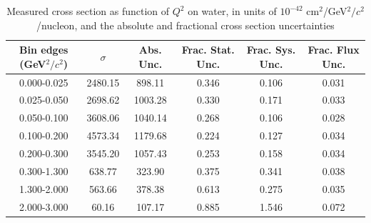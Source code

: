 \documentclass[../main.tex]{subfiles}
\begin{document}
\begin{table}
  \centering
  \renewcommand{\arraystretch}{1.15}
  \caption{Measured cross section as function of $Q^2$ on water, in units of $10^{-42}$ $\text{cm}^2$/GeV${}^2/c{}^2$/nucleon, and the absolute and fractional cross section uncertainties}
    \begin{tabular}{c||c|c||c|c|c}
      Bin edges (GeV${}^2/c{}^2$) &  $\sigma$  &  Abs. Unc.  &  Frac. Stat. Unc.  &  Frac. Sys. Unc.  &  Frac. Flux Unc. \\
      \hline
      \hline
      0.000-0.025 & 2480.15 & 898.11 & 0.346 & 0.106 & 0.031\\
      0.025-0.050 & 2698.62 & 1003.28 & 0.330 & 0.171 & 0.033\\
      0.050-0.100 & 3608.06 & 1040.14 & 0.268 & 0.106 & 0.028\\
      0.100-0.200 & 4573.34 & 1179.68 & 0.224 & 0.127 & 0.034\\
      0.200-0.300 & 3545.20 & 1057.43 & 0.253 & 0.158 & 0.034\\
      0.300-1.300 & 638.77 & 323.90 & 0.375 & 0.341 & 0.038\\
      1.300-2.000 & 563.66 & 378.38 & 0.613 & 0.275 & 0.035\\
      2.000-3.000 & 60.16 & 107.17 & 0.885 & 1.546 & 0.072
    \end{tabular}
  \label{tbl:datanucleonnuc10q2a}
\end{table}
\pagebreak
\end{document}
